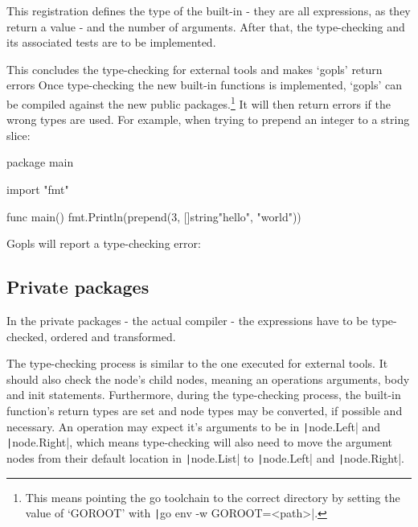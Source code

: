 \begin{code}
\end{code}
This registration defines the type of the built-in - they are all expressions,
as they return a value - and the number of arguments.
After that, the type-checking and its associated tests are to be implemented.

This concludes the type-checking for external tools and makes `gopls' return errors
Once type-checking the new built-in functions is implemented, `gopls' can be
compiled against the new public packages.\footnote{
This means pointing the go toolchain to the correct directory by setting
the value of `GOROOT' with \texttt|go env -w GOROOT=<path>|.
}
It will then return errors if the wrong types are used. For example, when trying
to prepend an integer to a string slice:

\begin{gocode}
package main

import "fmt"

func main() {
    fmt.Println(prepend(3, []string{"hello", "world"}))
}
\end{gocode}

Gopls will report a type-checking error:

\subsection{Private packages}

In the private packages - the actual compiler - the expressions have to be
type-checked, ordered and transformed.

The type-checking process is similar to the one executed for external tools.
It should also check the node's child nodes, meaning an operations
arguments, body and init statements. Furthermore, during the type-checking
process, the built-in function's return types are set and node types
may be converted, if possible and necessary.
An operation may expect it's arguments to be in \texttt|node.Left|
and \texttt|node.Right|, which means type-checking will also need
to move the argument nodes from their default location in
\texttt|node.List| to \texttt|node.Left| and
\texttt|node.Right|.

